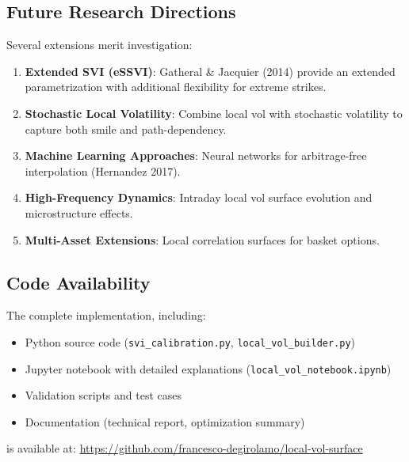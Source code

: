 \documentclass[12pt,a4paper]{article}
\begin{document}
\subsection{Future Research Directions}

Several extensions merit investigation:

\begin{enumerate}
    \item \textbf{Extended SVI (eSSVI)}: Gatheral \& Jacquier (2014) provide an extended parametrization with additional flexibility for extreme strikes.
    
    \item \textbf{Stochastic Local Volatility}: Combine local vol with stochastic volatility to capture both smile and path-dependency.
    
    \item \textbf{Machine Learning Approaches}: Neural networks for arbitrage-free interpolation (Hernandez 2017).
    
    \item \textbf{High-Frequency Dynamics}: Intraday local vol surface evolution and microstructure effects.
    
    \item \textbf{Multi-Asset Extensions}: Local correlation surfaces for basket options.
\end{enumerate}

\subsection{Code Availability}

The complete implementation, including:
\begin{itemize}
    \item Python source code (\texttt{svi\_calibration.py}, \texttt{local\_vol\_builder.py})
    \item Jupyter notebook with detailed explanations (\texttt{local\_vol\_notebook.ipynb})
    \item Validation scripts and test cases
    \item Documentation (technical report, optimization summary)
\end{itemize}

is available at: \url{https://github.com/francesco-degirolamo/local-vol-surface}
\end{document}

